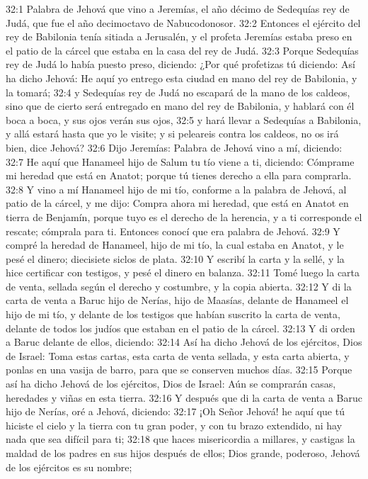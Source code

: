 32:1 Palabra de Jehová que vino a Jeremías, el año décimo de Sedequías rey de Judá, que fue el año decimoctavo de Nabucodonosor. 
32:2 Entonces el ejército del rey de Babilonia tenía sitiada a Jerusalén, y el profeta Jeremías estaba preso en el patio de la cárcel que estaba en la casa del rey de Judá. 
32:3 Porque Sedequías rey de Judá lo había puesto preso, diciendo: ¿Por qué profetizas tú diciendo: Así ha dicho Jehová: He aquí yo entrego esta ciudad en mano del rey de Babilonia, y la tomará; 
32:4 y Sedequías rey de Judá no escapará de la mano de los caldeos, sino que de cierto será entregado en mano del rey de Babilonia, y hablará con él boca a boca, y sus ojos verán sus ojos, 
32:5 y hará llevar a Sedequías a Babilonia, y allá estará hasta que yo le visite; y si peleareis contra los caldeos, no os irá bien, dice Jehová? 
32:6 Dijo Jeremías: Palabra de Jehová vino a mí, diciendo: 
32:7 He aquí que Hanameel hijo de Salum tu tío viene a ti, diciendo: Cómprame mi heredad que está en Anatot; porque tú tienes derecho a ella para comprarla. 
32:8 Y vino a mí Hanameel hijo de mi tío, conforme a la palabra de Jehová, al patio de la cárcel, y me dijo: Compra ahora mi heredad, que está en Anatot en tierra de Benjamín, porque tuyo es el derecho de la herencia, y a ti corresponde el rescate; cómprala para ti. Entonces conocí que era palabra de Jehová. 
32:9 Y compré la heredad de Hanameel, hijo de mi tío, la cual estaba en Anatot, y le pesé el dinero; diecisiete siclos de plata. 
32:10 Y escribí la carta y la sellé, y la hice certificar con testigos, y pesé el dinero en balanza. 
32:11 Tomé luego la carta de venta, sellada según el derecho y costumbre, y la copia abierta. 
32:12 Y di la carta de venta a Baruc hijo de Nerías, hijo de Maasías, delante de Hanameel el hijo de mi tío, y delante de los testigos que habían suscrito la carta de venta, delante de todos los judíos que estaban en el patio de la cárcel. 
32:13 Y di orden a Baruc delante de ellos, diciendo: 
32:14 Así ha dicho Jehová de los ejércitos, Dios de Israel: Toma estas cartas, esta carta de venta sellada, y esta carta abierta, y ponlas en una vasija de barro, para que se conserven muchos días. 
32:15 Porque así ha dicho Jehová de los ejércitos, Dios de Israel: Aún se comprarán casas, heredades y viñas en esta tierra. 
32:16 Y después que di la carta de venta a Baruc hijo de Nerías, oré a Jehová, diciendo: 
32:17 ¡Oh Señor Jehová! he aquí que tú hiciste el cielo y la tierra con tu gran poder, y con tu brazo extendido, ni hay nada que sea difícil para ti; 
32:18 que haces misericordia a millares, y castigas la maldad de los padres en sus hijos después de ellos; Dios grande, poderoso, Jehová de los ejércitos es su nombre; 

